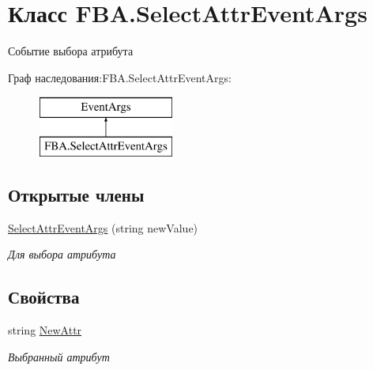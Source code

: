 \hypertarget{class_f_b_a_1_1_select_attr_event_args}{}\section{Класс F\+B\+A.\+Select\+Attr\+Event\+Args}
\label{class_f_b_a_1_1_select_attr_event_args}


Событие выбора атрибута  


Граф наследования\+:F\+B\+A.\+Select\+Attr\+Event\+Args\+:\begin{figure}[H]
\begin{center}
\leavevmode
\includegraphics[height=2.000000cm]{class_f_b_a_1_1_select_attr_event_args}
\end{center}
\end{figure}
\subsection*{Открытые члены}
\begin{DoxyCompactItemize}
\item 
\mbox{\hyperlink{class_f_b_a_1_1_select_attr_event_args_ab9c1a999984a00fdbc760f24ac9562a3}{Select\+Attr\+Event\+Args}} (string new\+Value)
\begin{DoxyCompactList}\small\item\em Для выбора атрибута \end{DoxyCompactList}\end{DoxyCompactItemize}
\subsection*{Свойства}
\begin{DoxyCompactItemize}
\item 
string \mbox{\hyperlink{class_f_b_a_1_1_select_attr_event_args_a5f3440a12bc2e497fd7f4da8b46ebd96}{New\+Attr}}
\begin{DoxyCompactList}\small\item\em Выбранный атрибут \end{DoxyCompactList}\end{DoxyCompactItemize}


